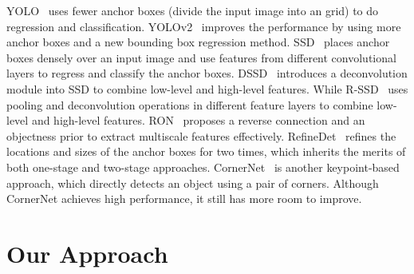\documentclass[10pt,twocolumn,letterpaper]{article}
\begin{document}
YOLO~\cite{redmon2016you} uses fewer anchor boxes (divide the input image into an  grid) to do regression and classification. YOLOv2~\cite{redmon2017yolo9000} improves the performance by using more anchor boxes and a new bounding box regression method. SSD~\cite{liu2016ssd} places anchor boxes densely over an input image and use features from different convolutional layers to regress and classify the anchor boxes. DSSD~\cite{fu2017dssd} introduces a deconvolution module into SSD to combine low-level and high-level features. While R-SSD~\cite{jeong2017enhancement} uses pooling and deconvolution operations in different feature layers to combine low-level and high-level features. RON~\cite{kong2017ron} proposes a reverse connection and an objectness prior to extract multiscale features effectively. RefineDet~\cite{zhang2018single} refines the locations and sizes of the anchor boxes for two times, which inherits the merits of both one-stage and two-stage approaches. CornerNet~\cite{law2018cornernet} is another keypoint-based approach, which directly detects an object using a pair of corners. Although CornerNet achieves high performance, it still has more room to improve.

\section{Our Approach}
\label{Approach}
\end{document}
